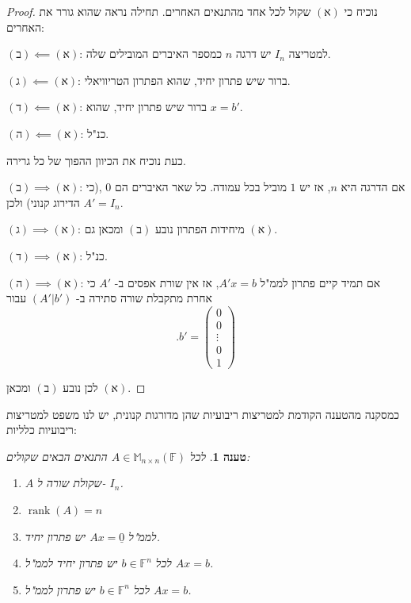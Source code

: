 \documentclass[12pt]{report}
\theoremstyle{plain}
\newtheorem{proposition}[theorem]{טענה}
\theoremstyle{definition}
\newcommand{\F}{\mathbb{F}}
\DeclareMathOperator{\rank}{rank}
\newcommand{\M}{\mathbb{M}}
\newcommand{\0}{\mathbf{0}}
\begin{document}
\begin{proof}
נוכיח כי
$(\text{א})$
שקול לכל אחד מהתנאים האחרים. תחילה נראה שהוא גורר את האחרים:

$(\text{ב}) \impliedby (\text{א})$:
למטריצה
$I_n$
יש דרגה 
$n$
כמספר האיברים המובילים שלה.

\noindent $(\text{ג}) \impliedby (\text{א})$:
ברור שיש פתרון יחיד, שהוא הפתרון הטריוויאלי.

\noindent $(\text{ד}) \impliedby (\text{א})$:
ברור שיש פתרון יחיד, שהוא
$x=b'$.

\noindent $(\text{ה}) \impliedby (\text{א})$:
כנ"ל.

כעת נוכיח את הכיוון ההפוך של כל גרירה.

\noindent $(\text{ב}) \implies (\text{א})$:
אם הדרגה היא 
$n$,
אז יש
$1$
מוביל בכל עמודה. כל שאר האיברים הם
$0$
,(כי הדירוג קנוני)
ולכן
$A'=I_n$.

\noindent $(\text{ג}) \implies (\text{א})$:
מיחידות הפתרון נובע 
$(\text{ב})$
ומכאן גם
$(\text{א})$.


\noindent $(\text{ד}) \implies (\text{א})$:
כנ"ל.


\noindent $(\text{ה}) \implies (\text{א})$:
אם תמיד קיים פתרון לממ"ל
$A'x=b$,
אז אין שורת אפסים ב-
$A'$
כי אחרת מתקבלת שורה סתירה ב-
$(A'|b')$
עבור
$$
.b'=\begin{pmatrix}
0\\
0\\
\vdots \\
0 \\
1
\end{pmatrix}
$$

לכן נובע
$(\text{ב})$
ומכאן
$(\text{א})$.

\end{proof}

כמסקנה מהטענה הקודמת למטריצות ריבועיות שהן מדורגות קנונית, יש לנו משפט למטריצות ריבועיות כלליות:

\begin{proposition}\label{prop:invertible}
לכל
$A\in\M_{n\times n}(\F)$
התנאים הבאים שקולים:
\begin{enumerate}[label=(\alph*)]
\item 
$A$
שקולת שורה ל-
$I_n$.


\item 
$\rank(A)=n$


\item 
לממ"ל
$Ax=\underline{0}$
יש פתרון יחיד.


\item 
לכל
$b\in\F^n$
יש פתרון יחיד לממ"ל
$Ax=b$.


\item 
לכל
$b\in\F^n$
יש פתרון לממ"ל
$Ax=b$.


\end{enumerate}
\end{proposition}
\end{document}

